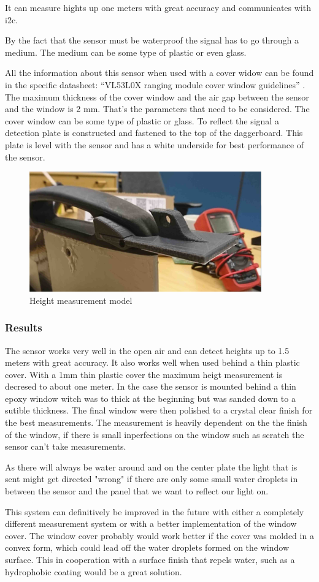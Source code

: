 It can measure hights up one meters with great accuracy and communicates with \gls{i2c}.

By the fact that the sensor must be waterproof the signal has to go through a medium. The medium can be some type of plastic or even glass.   

All the information about this sensor when used with a cover widow can be found in the specific datasheet: “VL53L0X ranging module cover window guidelines” \cite{Tof_cover}. The maximum thickness of the cover window and the air gap between the sensor and the window is 2 mm. That’s the parameters that need to be considered. The cover window can be some type of plastic or glass. To reflect the signal a detection plate is constructed and fastened to the top of the daggerboard. This plate is level with the sensor and has a white underside for best performance of the sensor. 

\begin{figure}[H]
	\includegraphics[width = 10cm]{Figures/height_measure.jpg}
	\caption{Height measurement model}
	\label{height_measure}
\end{figure}


\subsubsection{Results}

The sensor works very well in the open air and can detect heights up to 1.5 meters with great accuracy. It also works well when used behind a thin plastic cover. With a 1mm thin plastic cover the maximum heigt measurement is decresed to about one meter. In the case the sensor is mounted behind a thin epoxy window witch was to thick at the beginning but was sanded down to a sutible thickness. The final window were then polished to a crystal clear finish for the best measurements. The measurement is heavily dependent on the the finish of the window, if there is small inperfections on the window such as scratch the sensor can't take measurements.

As there will always be water around and on the center plate the light that is sent might get directed "wrong" if there are only some small water droplets in between the sensor and the panel that we want to reflect our light on.  

This system can definitively be improved in the future with either a completely different measurement system or with a better implementation of the window cover. The window cover probably would work better if the cover was molded in a convex form, which could lead off the water droplets formed on the window surface. This in cooperation with a surface finish that repels water, such as a hydrophobic coating would be a great solution. 


